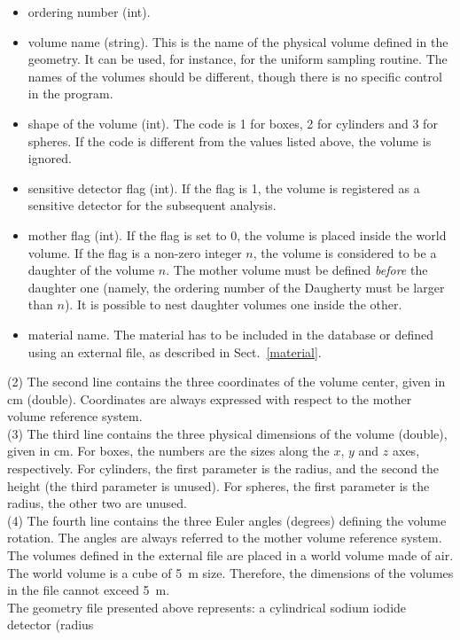 \documentclass[a4paper,12pt,twoside]{article}
\begin{document}
\begin{itemize}
\item ordering number (int).
\item volume name (string). This is the name of the physical volume defined 
in the geometry. It can be used, for instance, for the uniform sampling 
routine. The names of the volumes should be different, though there is no 
specific control in the program. 
\item shape of the volume (int). The code is 1 for boxes, 2 for cylinders and 
3 for spheres. If the code is different from the values listed above, the volume  
is ignored.
\item sensitive detector flag (int). If the flag is 1, the volume is 
registered as a sensitive detector for the subsequent analysis. 
\item mother flag (int). If the flag is set to 0, the volume is placed inside the 
world volume. If the flag is a non-zero integer $n$, the volume is considered 
to be a daughter of the volume $n$. The mother volume must be defined 
\emph{before} the daughter one (namely, the ordering number of the Daugherty 
must be larger than $n$). It is possible to nest daughter volumes one inside 
the other.
\item material name. The material has to be included in the \mage database 
or defined using an external file, as described in Sect.~\ref{material}.
\end{itemize}
(2) The second line contains the three coordinates of the volume center, given in cm (double). 
Coordinates are always expressed with respect to the mother volume reference system. \\
(3) The third line contains the three physical dimensions of the volume (double), given in cm. 
For boxes, the numbers are the sizes along the $x$, $y$ and $z$ axes, respectively. 
For cylinders, the first parameter is the radius, and the second the height (the 
third parameter is unused).  
For spheres, the first parameter is the radius, the other two are unused. \\
(4) The fourth line contains the three Euler angles (degrees) defining the volume rotation. 
The angles are always referred to the mother volume reference system. \\
The volumes defined in the external file are placed in a world volume made of air. The 
world volume is a cube of 5~m size. Therefore, the dimensions of the volumes in 
the file cannot exceed 5~m.\\
The geometry file presented above represents: a cylindrical sodium iodide detector (radius 
\end{document}
